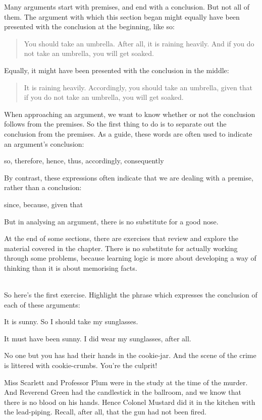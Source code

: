 Many arguments start with premises, and end with a conclusion. But not all of them. The argument with which this section began might equally have been presented with the conclusion at the beginning, like so:
	\begin{quote}
		You should take an umbrella. After all, it is raining heavily. And if you do not take an umbrella, you will get soaked. 
	\end{quote}
Equally, it might have been presented with the conclusion in the middle:
	\begin{quote}
		It is raining heavily. Accordingly, you should take an umbrella, given that if you do not take an umbrella, you will get soaked.
	\end{quote}
When approaching an argument, we want to know whether or not the conclusion follows from the premises. So the first thing to do is to separate out the conclusion from the premises. As a guide, these words are often used to indicate an argument's conclusion:
	\begin{center}
		so, therefore, hence, thus, accordingly, consequently
	\end{center}
By contrast, these expressions often indicate that we are dealing with a premise, rather than a conclusion:
	\begin{center}
		since, because, given that
	\end{center}
But in analysing an argument, there is no substitute for a good nose.

\practiceproblems
At the end of some sections, there are exercises that review and explore the material covered in the chapter. There is no substitute for actually working through some problems, because learning logic is more about developing a way of thinking than it is about memorising facts.


\
\\So here's the first exercise. Highlight the phrase which expresses the conclusion of each of these arguments:
\begin{earg}
	\item It is sunny. So I should take my sunglasses.
	\item It must have been sunny. I did wear my sunglasses, after all.
	\item No one but you has had their hands in the cookie-jar. And the scene of the crime is littered with cookie-crumbs. You're the culprit!
	\item Miss Scarlett and Professor Plum were in the study at the time of the murder. And Reverend Green had the candlestick in the ballroom, and we know that there is no blood on his hands. Hence Colonel Mustard did it in the kitchen with the lead-piping. Recall, after all, that the gun had not been fired.
\end{earg}


